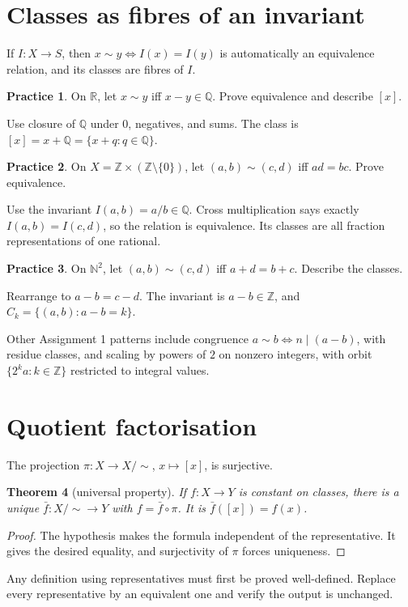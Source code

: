 \documentclass[11pt,openany]{book}
\newcommand{\N}{\mathbb N}\newcommand{\Z}{\mathbb Z}
\newcommand{\Q}{\mathbb Q}\newcommand{\R}{\mathbb R}
\newtheorem{theorem}{Theorem}[chapter]
\theoremstyle{definition}
\newtheorem{exercise}[theorem]{Practice}
\begin{document}
\section{Classes as fibres of an invariant}
If $I:X\to S$, then $x\sim y\iff I(x)=I(y)$ is automatically an equivalence relation, and its classes are fibres of $I$.
\begin{exercise}On $\R$, let $x\sim y$ iff $x-y\in\Q$. Prove equivalence and describe $[x]$.\end{exercise}
\begin{solution}Use closure of $\Q$ under $0$, negatives, and sums. The class is $[x]=x+\Q=\{x+q:q\in\Q\}$.\end{solution}
\begin{exercise}On $X=\Z\times(\Z\setminus\{0\})$, let $(a,b)\sim(c,d)$ iff $ad=bc$. Prove equivalence.\end{exercise}
\begin{solution}Use the invariant $I(a,b)=a/b\in\Q$. Cross multiplication says exactly $I(a,b)=I(c,d)$, so the relation is equivalence. Its classes are all fraction representations of one rational.\end{solution}
\begin{exercise}On $\N^2$, let $(a,b)\sim(c,d)$ iff $a+d=b+c$. Describe the classes.\end{exercise}
\begin{solution}Rearrange to $a-b=c-d$. The invariant is $a-b\in\Z$, and $C_k=\{(a,b):a-b=k\}$.\end{solution}
Other Assignment 1 patterns include congruence $a\sim b\iff n\mid(a-b)$, with residue classes, and scaling by powers of $2$ on nonzero integers, with orbit $\{2^ka:k\in\Z\}$ restricted to integral values.

\section{Quotient factorisation}
The projection $\pi:X\to X/{\sim}$, $x\mapsto[x]$, is surjective.
\begin{theorem}[universal property]If $f:X\to Y$ is constant on classes, there is a unique $\bar f:X/{\sim}\to Y$ with $f=\bar f\circ\pi$. It is $\bar f([x])=f(x)$.\end{theorem}
\begin{proof}The hypothesis makes the formula independent of the representative. It gives the desired equality, and surjectivity of $\pi$ forces uniqueness.\end{proof}
\begin{warningbox}Any definition using representatives must first be proved well-defined. Replace every representative by an equivalent one and verify the output is unchanged.\end{warningbox}
\end{document}
